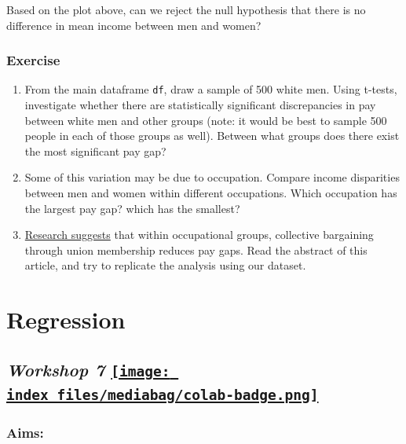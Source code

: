 \documentclass[
  letterpaper,
  DIV=11,
  numbers=noendperiod]{scrreprt}
\providecommand{\tightlist}{%
  \setlength{\itemsep}{0pt}\setlength{\parskip}{0pt}}\usepackage{longtable,booktabs,array}
\begin{document}
Based on the plot above, can we reject the null hypothesis that there is
no difference in mean income between men and women?

\hypertarget{exercise-21}{%
\subsection{Exercise}\label{exercise-21}}

\begin{enumerate}
\def\labelenumi{\arabic{enumi}.}
\tightlist
\item
  From the main dataframe \texttt{df}, draw a sample of 500 white men.
  Using t-tests, investigate whether there are statistically significant
  discrepancies in pay between white men and other groups (note: it
  would be best to sample 500 people in each of those groups as well).
  Between what groups does there exist the most significant pay gap?
\item
  Some of this variation may be due to occupation. Compare income
  disparities between men and women within different occupations. Which
  occupation has the largest pay gap? which has the smallest?
\item
  \href{https://journals.sagepub.com/doi/abs/10.1177/0730888401028004005}{Research
  suggests} that within occupational groups, collective bargaining
  through union membership reduces pay gaps. Read the abstract of this
  article, and try to replicate the analysis using our dataset.
\end{enumerate}


\hypertarget{regression}{%
\chapter{Regression}\label{regression}}

\hypertarget{workshop-7-open-in-colab-1}{%
\section[\emph{Workshop 7} ]{\texorpdfstring{\emph{Workshop 7}
\href{https://colab.research.google.com/github/oballinger/QM2/blob/main/notebooks/W07.\%20Linear\%20Regression.ipynb}{\protect\texttt{[image: index\_files/mediabag/colab-badge.png]}}}{Workshop 7 Open In Colab}}\label{workshop-7-open-in-colab-1}}

\hypertarget{aims-5}{%
\subsection{Aims:}\label{aims-5}}
\end{document}

